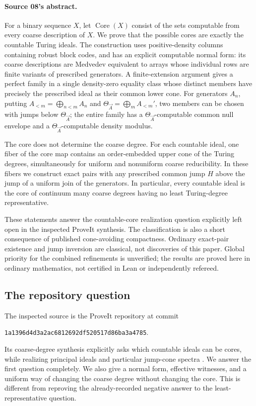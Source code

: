 \documentclass[11pt,letterpaper]{article}
\theoremstyle{plain}
\theoremstyle{definition}
\theoremstyle{remark}
\numberwithin{equation}{section}
\newcommand{\Core}{\operatorname{Core}}
\newcommand{\Alt}[1]{A_{<#1}}            %
\begin{document}
\paragraph{Source 08's abstract.}
{\small For a binary sequence $X$, let $\Core(X)$ consist of the sets computable from
every coarse description of $X$. We prove that the possible cores are exactly the
countable Turing ideals. The construction uses positive-density columns containing
robust block codes, and has an explicit computable normal form: its coarse
descriptions are Medvedev equivalent to arrays whose individual rows are finite
variants of prescribed generators. A finite-extension argument gives a perfect family
in a single density-zero equality class whose distinct members have precisely the
prescribed ideal as their common lower cone. For generators $A_n$, putting
$\Alt m=\bigoplus_{n<m}A_n$ and $\Theta_{\vec A}=\bigoplus_m \Alt m'$, two members can
be chosen with jumps below $\Theta_{\vec A}$; the entire family has a
$\Theta_{\vec A}$-computable common null envelope and a $\Theta_{\vec A}$-computable
density modulus.

The core does not determine the coarse degree. For each countable ideal, one fiber of
the core map contains an order-embedded upper cone of the Turing degrees,
simultaneously for uniform and nonuniform coarse reducibility. In these fibers we
construct exact pairs with any prescribed common jump $H$ above the jump of a uniform
join of the generators. In particular, every countable ideal is the core of continuum
many coarse degrees having no least Turing-degree representative.

These statements answer the countable-core realization question explicitly left open
in the inspected ProveIt synthesis. The classification is also a short consequence of
published cone-avoiding compactness. Ordinary exact-pair existence and jump inversion
are classical, not discoveries of this paper. Global priority for the combined
refinements is unverified; the results are proved here in ordinary mathematics, not
certified in Lean or independently refereed.\par}

\subsection{The repository question}
The inspected source is the ProveIt repository at commit
\begin{center}\small\texttt{1a1396d4d3a2ac6812692df520517d86ba3a4785}.\end{center}
Its coarse-degree synthesis explicitly asks which countable ideals can be cores,
while realizing principal ideals and particular jump-cone spectra \cite{Repo}. We
answer the first question completely. We also give a normal form, effective
witnesses, and a uniform way of changing the coarse degree without changing the
core. This is different from reproving the already-recorded negative answer to the
least-representative question.
\end{document}
